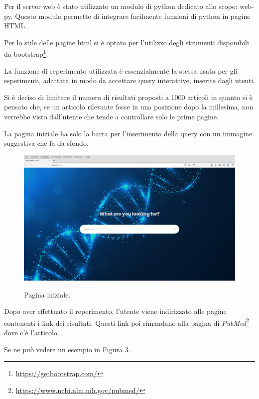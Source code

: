 \documentclass[runningheads]{llncs}
\begin{document}
Per il server web \`e stato utilizzato un modulo di python dedicato allo scopo: web-py.
Questo modulo permette di integrare facilmente funzioni di python in pagine HTML.

Per lo stile delle pagine html si \`e optato per l'utilizzo degli strumenti
disponibili da bootstrap\footnote{\url{https://getbootstrap.com/}}.

La funzione di reperimento utilizzata \`e essenzialmente la stessa usata per gli esperimenti,
adattata in modo da accettare query interattive, inserite dagli utenti.

Si \`e deciso di limitare il numero di risultati proposti a 1000 articoli in quanto si \`e pensato che, se un articolo rilevante fosse in una posizione dopo la millesima, non verrebbe visto dall'utente
che tende a controllare solo le prime pagine.

La pagina iniziale ha solo la barra per l'inserimento della query con un immagine suggestiva che fa da sfondo. 

\begin{figure}%
    \centering
    {{\includegraphics[width=1\linewidth]{index} }}%
    \caption{Pagina iniziale.}%
\end{figure}

Dopo aver effettuato il reperimento, l'utente viene indirizzato alle pagine contenenti
i link dei risultati.
Questi link poi rimandano alla pagina di \emph{PubMed}\footnote{\url{https://www.ncbi.nlm.nih.gov/pubmed/}} dove c'\`e l'articolo.

Se ne pu\`o vedere un esempio in Figura 3.
\end{document}
